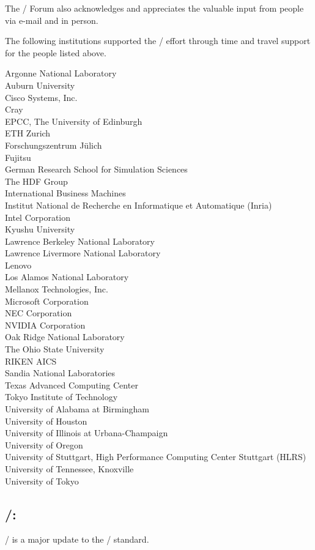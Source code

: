 The \MPI/ Forum also acknowledges and appreciates the valuable input
from people via e-mail and in person.


The following institutions supported the \MPIIIIDOTI/ effort through
time and travel support for the people listed above.

\medskip

\begin{obeylines}
Argonne National Laboratory
Auburn University
Cisco Systems, Inc.
Cray
EPCC, The University of Edinburgh
ETH Zurich
Forschungszentrum J\"ulich
Fujitsu
German Research School for Simulation Sciences
The HDF Group
International Business Machines
Institut National de Recherche en Informatique et Automatique (Inria)
Intel Corporation
Kyushu University
Lawrence Berkeley National Laboratory
Lawrence Livermore National Laboratory
Lenovo
Los Alamos National Laboratory
Mellanox Technologies, Inc.
Microsoft Corporation
NEC Corporation
NVIDIA Corporation
Oak Ridge National Laboratory
The Ohio State University
RIKEN AICS
Sandia National Laboratories
Texas Advanced Computing Center
Tokyo Institute of Technology
University of Alabama at Birmingham
University of Houston
University of Illinois at Urbana-Champaign
University of Oregon
University of Stuttgart, High Performance Computing Center Stuttgart (HLRS)
University of Tennessee, Knoxville
University of Tokyo
\end{obeylines}

\subsection*{\MPIIVDOTO/:}
\MPIIVDOTO/ is a major update to the \MPI/ standard.

